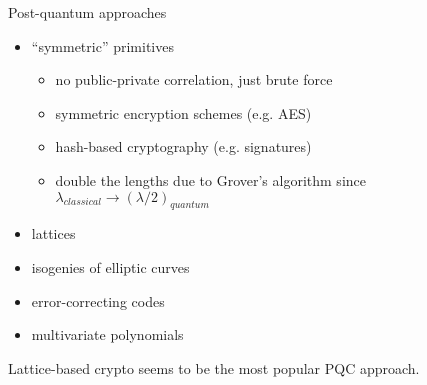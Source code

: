 \begin{frame}{Post-quantum approaches}
  \begin{itemize}[<+(1)->]
    \item \enquote{symmetric} primitives
    \begin{itemize}
      \item no public-private correlation, just brute force
      \item symmetric encryption schemes (e.g. AES)
      \item hash-based cryptography (e.g. signatures)
      \item double the lengths due to Grover's algorithm since $\lambda_\mathit{classical} \to (\lambda/2)_\mathit{quantum}$
    \end{itemize}
    \item lattices
    \item isogenies of elliptic curves
    \item error-correcting codes
    \item multivariate polynomials
  \end{itemize}

  \vspace*{1em}

  \pause
  Lattice-based crypto seems to be the most popular PQC approach.
\end{frame}

